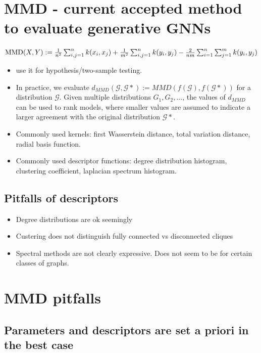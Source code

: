 \documentclass[12pt]{article}
\begin{document}
\section{MMD - current accepted method to evaluate generative GNNs}
\label{sec:orgeea2349}
\(\text{MMD}(X, Y) := {1\over n^2} \sum_{i,j=1}^{n}k(x_i, x_j) + {1\over m^2} \sum_{i,j=1}^{n}k(y_i, y_j) - {2\over nm} \sum_{i=1}^{n}\sum_{j=1}^{m}k(y_i, y_j)\)
\begin{itemize}
\item use it for hypothesis/two-sample testing.
\item In practice, we evaluate \(d_{MMD}(\mathcal{G},\mathcal{G*}) :=
  MMD(f(\mathcal{G}),f(\mathcal{G}*))\) for a distribution \(\mathcal{G}\). Given
multiple distributions \(G_1, G_2, \hdots\), the values of \(d_{MMD}\) can be used
to rank models, where smaller values are assumed to indicate a larger
agreement with the original distribution \(\mathcal{G}*\).
\item Commonly used kernels: first Wasserstein distance, total variation distance,
radial basis function.
\item Commonly used descriptor functions: degree distribution histogram, clustering
coefficient, laplacian spectrum histogram.
\end{itemize}
\subsection{Pitfalls of descriptors}
\label{sec:org29e11db}
\begin{itemize}
\item Degree distributions are ok seemingly
\item Custering does not distinguish fully connected vs disconnected cliques
\item Spectral methods are not clearly expressive. Does not seem to be for certain classes of graphs.
\end{itemize}

\section{MMD pitfalls}
\label{sec:orge0585d9}
\subsection{Parameters and descriptors are set a priori in the best case}
\label{sec:org8aad64c}
\end{document}
